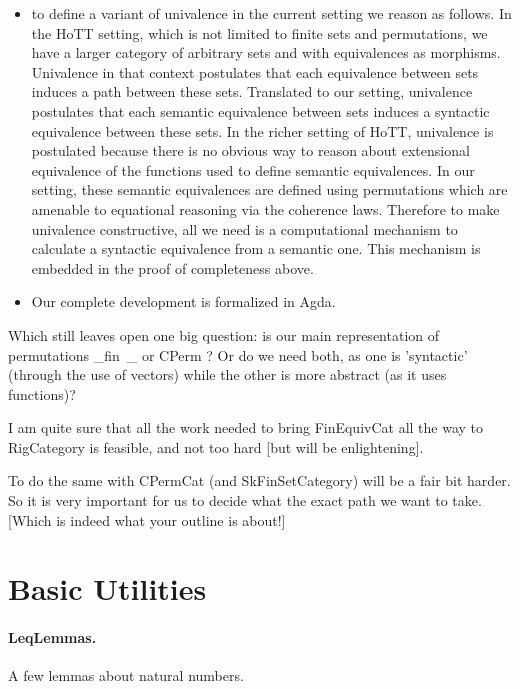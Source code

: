 \documentclass{article}
\begin{document}
\begin{itemize}
\item to define a variant of univalence in the current setting we
  reason as follows. In the HoTT setting, which is not limited to
  finite sets and permutations, we have a larger category of arbitrary
  sets and with equivalences as morphisms. Univalence in that context
  postulates that each equivalence between sets induces a path between
  these sets. Translated to our setting, univalence postulates that
  each semantic equivalence between sets induces a syntactic
  equivalence between these sets. In the richer setting of HoTT,
  univalence is postulated because there is no obvious way to reason
  about extensional equivalence of the functions used to define
  semantic equivalences. In our setting, these semantic equivalences
  are defined using permutations which are amenable to equational
  reasoning via the coherence laws. Therefore to make univalence
  constructive, all we need is a computational mechanism to calculate
  a syntactic equivalence from a semantic one. This mechanism is
  embedded in the proof of completeness above. 

\item Our complete development is formalized in Agda. 
\end{itemize}

Which still leaves open one big question: is our main representation
of permutations _fin~_ or CPerm ?  Or do we need both, as one is
'syntactic' (through the use of vectors) while the other is more
abstract (as it uses functions)?

I am quite sure that all the work needed to bring FinEquivCat all the
way to RigCategory is feasible, and not too hard [but will be
enlightening].

To do the same with CPermCat (and SkFinSetCategory) will be a fair bit
harder.  So it is very important for us to decide what the exact path
we want to take.  [Which is indeed what your outline is about!]




\section{Basic Utilities}

\paragraph*{LeqLemmas.} A few lemmas about natural numbers. 
\end{document}
